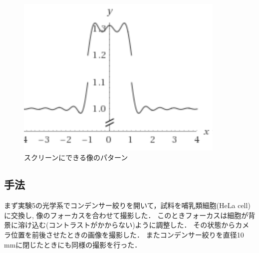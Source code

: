 \documentclass[titlepage]{jsarticle}
\begin{document}
\begin{figure}[htbp]
    \centering
    \includegraphics[width=10cm]{phase.png}
    \caption{スクリーンにできる像のパターン}
    \label{fig:phase}
\end{figure}

\subsection{手法}
まず実験5の光学系でコンデンサー絞りを開いて，試料を哺乳類細胞(HeLa cell)に交換し, 像のフォーカスを合わせて撮影した．
このときフォーカスは細胞が背景に溶け込む(コントラストがかからない)ように調整した．
その状態からカメラ位置を前後させたときの画像を撮影した．
またコンデンサー絞りを直径10\,mmに閉じたときにも同様の撮影を行った．
\end{document}
